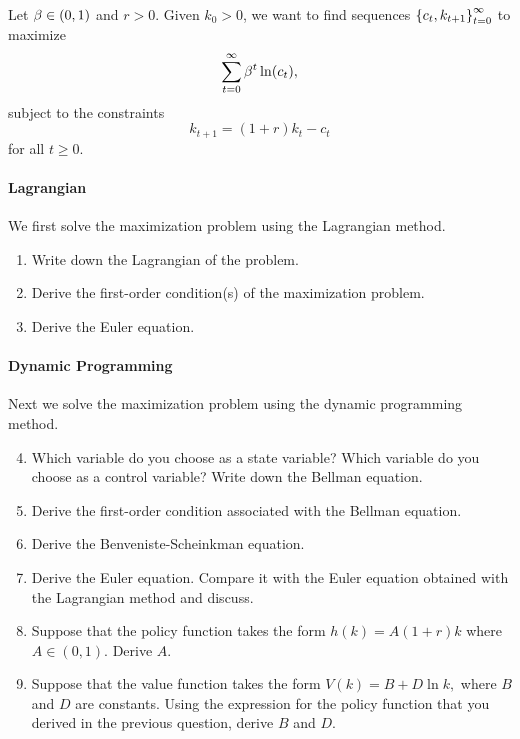 \documentclass[letterpaper, 11pt, leqno]{article}
\begin{document}
Let $\beta \in (0,1)$ and $r>0$. Given $k_{0}>0$, we want to find sequences $\left\lbrace c_{t},k_{t+1} \right\rbrace_{t=0}^{\infty}$ to maximize 
\begin{equation*}
\sum_{t=0}^{\infty}\b^{t} \ln{c_{t}}, 
\end{equation*}
subject to the constraints
\begin{equation*}
k_{t+1}=(1+r) k_{t}-c_{t}
\end{equation*}
for all $t\geq 0$.

\paragraph{Lagrangian} We first solve the maximization problem using the Lagrangian method.
\begin{enumerate}
\item Write down the Lagrangian of the problem.
\item Derive the first-order condition(s) of the maximization problem.
\item Derive the Euler equation.
\end{enumerate}

\paragraph{Dynamic Programming} Next we solve the maximization problem using the dynamic programming method.
\begin{enumerate}\setcounter{enumi}{3}
\item Which variable do you choose as a state variable? Which variable do you choose as a control variable? Write down the Bellman equation.
\item Derive the first-order condition associated with the Bellman equation.
\item Derive the Benveniste-Scheinkman equation.
\item Derive the Euler equation. Compare it with the Euler equation obtained with the Lagrangian method and discuss.
\item Suppose that the policy function takes the form $h(k)=A (1+r) k$ where $A\in (0,1) $. Derive $A$.
\item Suppose that the value function takes the form $V(k)=B+D \ln{k},$ where $B$ and $D$ are constants. Using the expression for the policy function that you derived in the previous question, derive $B$ and $D$.
\end{enumerate}
\end{document}
